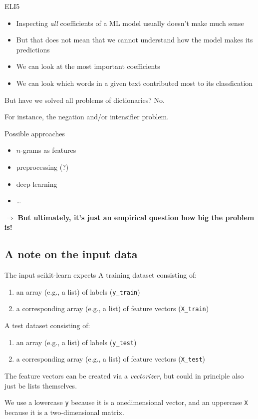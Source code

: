 \documentclass[compress]{beamer}
\begin{document}
\begin{frame}{ELI5}
\begin{itemize}
	\item Inspecting \emph{all} coefficients of a ML model usually doesn't make much sense
	\item But that does not mean that we cannot understand how the model makes its predictions
	\item We can look at the most important coefficients
	\item We can look which words in a given text contributed most to its classfication
\end{itemize}
\end{frame}




\begin{frame}{But have we solved all problems of dictionaries?}
No.

For instance, the negation and/or intensifier problem.

Possible approaches
\begin{itemize}
	\item $n$-grams as features
	\item preprocessing (?)
	\item deep learning 
	\item \ldots
\end{itemize}
\pause

$\Rightarrow$ \textbf{But ultimately, it's just an empirical question how big the problem is!}


\end{frame}


\subsection{A note on the input data}

\begin{frame}{The input scikit-learn expects}
	A training dataset consisting of:
\begin{enumerate}
	\item an array (e.g., a list) of labels (\texttt{y\_train})
	\item a corresponding array (e.g., a list) of feature vectors (\texttt{X\_train})
\end{enumerate}

	A test dataset consisting of:
\begin{enumerate}
	\item an array (e.g., a list) of labels (\texttt{y\_test})
	\item a corresponding array (e.g., a list) of feature vectors (\texttt{X\_test})
\end{enumerate}

The feature vectors can be created via a \textit{vectorizer}, but could in principle also just be lists themselves.

We use a lowercase \texttt{y} because it is a onedimensional vector, and an uppercase \texttt{X} because it is a two-dimensional matrix.
\end{frame}
\end{document}
